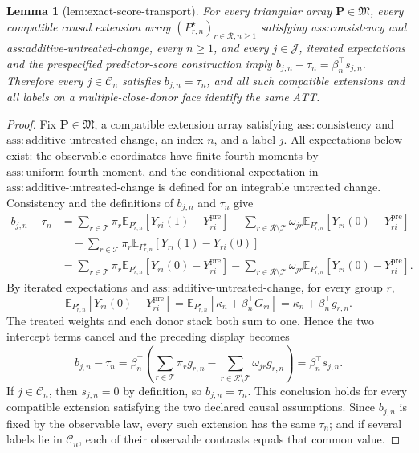 \documentclass{article}
\newtheorem{lemma}{Lemma}
\begin{document}
\begin{lemma}[lem:exact-score-transport]\label{lem:exact-score-transport}
For every triangular array \(\mathbf P\in\mathfrak M\), every compatible causal extension array \((P_{r,n}^{\star})_{r\in\mathcal R,n\ge1}\) satisfying ass:consistency and ass:additive-untreated-change, every \(n\ge1\), and every \(j\in\mathcal J\), iterated expectations and the prespecified predictor-score construction imply \(b_{j,n}-\tau_n=\beta_n^{\top}s_{j,n}\). Therefore every \(j\in\mathcal C_n\) satisfies \(b_{j,n}=\tau_n\), and all such compatible extensions and all labels on a multiple-close-donor face identify the same ATT.
\end{lemma}
\begin{proof}
Fix \(\mathbf P\in\mathfrak M\), a compatible extension array satisfying \(\mathrm{ass:consistency}\) and \(\mathrm{ass:additive\text{-}untreated\text{-}change}\), an index \(n\), and a label \(j\).  All expectations below exist: the observable coordinates have finite fourth moments by \(\mathrm{ass:uniform\text{-}fourth\text{-}moment}\), and the conditional expectation in \(\mathrm{ass:additive\text{-}untreated\text{-}change}\) is defined for an integrable untreated change.  Consistency and the definitions of \(b_{j,n}\) and \(\tau_n\) give
\[
\begin{aligned}
 b_{j,n}-\tau_n
 &=\sum_{r\in\mathcal T}\pi_r
     \mathbb E_{P_{r,n}^{\star}}[Y_{ri}(1)-Y_{ri}^{\mathrm{pre}}]
   -\sum_{r\in\mathcal R\setminus\mathcal T}\omega_{jr}
     \mathbb E_{P_{r,n}^{\star}}[Y_{ri}(0)-Y_{ri}^{\mathrm{pre}}]\\
 &\quad-
   \sum_{r\in\mathcal T}\pi_r
     \mathbb E_{P_{r,n}^{\star}}[Y_{ri}(1)-Y_{ri}(0)]\\
 &=\sum_{r\in\mathcal T}\pi_r
     \mathbb E_{P_{r,n}^{\star}}[Y_{ri}(0)-Y_{ri}^{\mathrm{pre}}]
   -\sum_{r\in\mathcal R\setminus\mathcal T}\omega_{jr}
     \mathbb E_{P_{r,n}^{\star}}[Y_{ri}(0)-Y_{ri}^{\mathrm{pre}}].
\end{aligned}
\]
By iterated expectations and \(\mathrm{ass:additive\text{-}untreated\text{-}change}\), for every group \(r\),
\[
 \mathbb E_{P_{r,n}^{\star}}[Y_{ri}(0)-Y_{ri}^{\mathrm{pre}}]
 =\mathbb E_{P_{r,n}^{\star}}[\kappa_n+\beta_n^{\top}G_{ri}]
 =\kappa_n+\beta_n^{\top}g_{r,n}.
\]
The treated weights and each donor stack both sum to one.  Hence the two intercept terms cancel and the preceding display becomes
\[
 b_{j,n}-\tau_n
 =\beta_n^{\top}\left(
   \sum_{r\in\mathcal T}\pi_rg_{r,n}
   -\sum_{r\in\mathcal R\setminus\mathcal T}\omega_{jr}g_{r,n}
  \right)
 =\beta_n^{\top}s_{j,n}.
\]
If \(j\in\mathcal C_n\), then \(s_{j,n}=0\) by definition, so \(b_{j,n}=\tau_n\).  This conclusion holds for every compatible extension satisfying the two declared causal assumptions.  Since \(b_{j,n}\) is fixed by the observable law, every such extension has the same \(\tau_n\); and if several labels lie in \(\mathcal C_n\), each of their observable contrasts equals that common value.
\end{proof}
\end{document}
